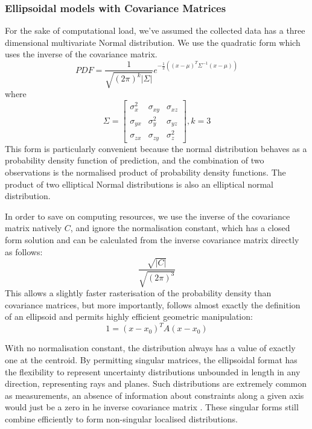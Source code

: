 \documentclass[a4paper, 11pt, titlepage]{article}
\begin{document}
    \subsubsection{Ellipsoidal models with Covariance Matrices}
      For the sake of computational load, we've assumed the collected data has a three dimensional multivariate Normal distribution.  We use the quadratic form which uses the inverse of the covariance matrix.
      \begin{equation}
      PDF = \frac{1}{\sqrt {(2\pi)^k|\Sigma|}} e^{-\frac{1}{2}\left( \left(x-\mu\right)^T \Sigma^{-1} \left(x-\mu\right) \right)}
      \end{equation}
      where
      \begin{equation}
      \Sigma=\begin{bmatrix}
        \sigma_x^2 & \sigma_{xy} & \sigma_{xz} \\[0.3em]
        \sigma_{yx} & \sigma_y^2 & \sigma_{yz} \\[0.3em]
        \sigma_{zx} & \sigma_{zy} & \sigma_z^2 
      \end{bmatrix}, k=3
      \end{equation}
      This form is particularly convenient because the normal distribution behaves as a probability density function of prediction, and the combination of two observations is the normalised product of probability density functions.  The product of two elliptical Normal distributions is also an elliptical normal distribution.  

      In order to save on computing resources, we use the inverse of the covariance matrix natively \(C\), and ignore the normalisation constant, which has a closed form solution and can be calculated from the inverse covariance matrix directly as follows:
      \begin{equation}
      \frac{\sqrt{|C|}}{\sqrt{(2\pi)^3}}
      \end{equation}
      This allows a slightly faster rasterisation of the probability density than covariance matrices, but more importantly, follows almost exactly the definition of an ellipsoid and permits highly efficient geometric manipulation:
      \begin{equation}
      1 = \left(x-x_0\right)^T A \left(x-x_0\right)
      \end{equation}

      With no normalisation constant, the distribution always has a value of exactly one at the centroid.
      By permitting singular matrices, the ellipsoidal format has the flexibility to represent uncertainty distributions unbounded in length in any direction, representing rays and planes.  Such distributions are extremely common as measurements, an absence of information about constraints along a given axis would just be a zero in he inverse covariance matrix \cite{UncertainGeo}.  These singular forms still combine efficiently to form non-singular localised distributions.
      
\end{document}
